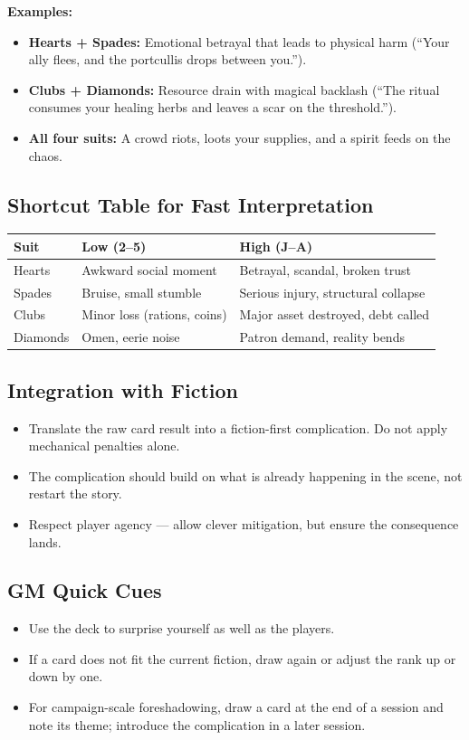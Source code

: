 \textbf{Examples:}
\begin{itemize}
  \item \textbf{Hearts + Spades:} Emotional betrayal that leads to physical harm (``Your ally flees, and the portcullis drops between you.'').
  \item \textbf{Clubs + Diamonds:} Resource drain with magical backlash (``The ritual consumes your healing herbs and leaves a scar on the threshold.'').
  \item \textbf{All four suits:} A crowd riots, loots your supplies, and a spirit feeds on the chaos.
\end{itemize}

\subsection{Shortcut Table for Fast Interpretation}

\begin{tabular}{@{}lll@{}}
\toprule
\textbf{Suit} & \textbf{Low (2--5)} & \textbf{High (J--A)} \\
\midrule
Hearts   & Awkward social moment & Betrayal, scandal, broken trust \\
Spades   & Bruise, small stumble & Serious injury, structural collapse \\
Clubs    & Minor loss (rations, coins) & Major asset destroyed, debt called \\
Diamonds & Omen, eerie noise & Patron demand, reality bends \\
\bottomrule
\end{tabular}

\subsection{Integration with Fiction}

\begin{itemize}
  \item Translate the raw card result into a fiction-first complication. Do not apply mechanical penalties alone.
  \item The complication should build on what is already happening in the scene, not restart the story.
  \item Respect player agency --- allow clever mitigation, but ensure the consequence lands.
\end{itemize}

\subsection{GM Quick Cues}

\begin{itemize}
  \item Use the deck to surprise yourself as well as the players.
  \item If a card does not fit the current fiction, draw again or adjust the rank up or down by one.
  \item For campaign-scale foreshadowing, draw a card at the end of a session and note its theme; introduce the complication in a later session.
\end{itemize}

